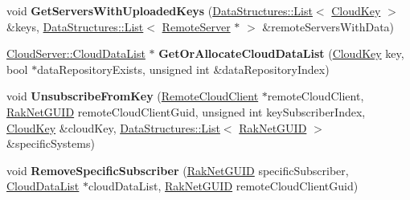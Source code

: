\begin{DoxyCompactItemize}
\item 
\hypertarget{class_rak_net_1_1_cloud_server_a79f583e54d15febc01656a9b9d668160}{void {\bfseries Get\-Servers\-With\-Uploaded\-Keys} (\hyperlink{class_data_structures_1_1_list}{Data\-Structures\-::\-List}$<$ \hyperlink{struct_rak_net_1_1_cloud_key}{Cloud\-Key} $>$ \&keys, \hyperlink{class_data_structures_1_1_list}{Data\-Structures\-::\-List}$<$ \hyperlink{struct_rak_net_1_1_cloud_server_1_1_remote_server}{Remote\-Server} $\ast$ $>$ \&remote\-Servers\-With\-Data)}\label{class_rak_net_1_1_cloud_server_a79f583e54d15febc01656a9b9d668160}

\item 
\hypertarget{class_rak_net_1_1_cloud_server_a4efe276b39cc626f002960ff9b1455ec}{\hyperlink{struct_rak_net_1_1_cloud_server_1_1_cloud_data_list}{Cloud\-Server\-::\-Cloud\-Data\-List} $\ast$ {\bfseries Get\-Or\-Allocate\-Cloud\-Data\-List} (\hyperlink{struct_rak_net_1_1_cloud_key}{Cloud\-Key} key, bool $\ast$data\-Repository\-Exists, unsigned int \&data\-Repository\-Index)}\label{class_rak_net_1_1_cloud_server_a4efe276b39cc626f002960ff9b1455ec}

\item 
\hypertarget{class_rak_net_1_1_cloud_server_af071cfd5ed3ed39d323469a0eb539247}{void {\bfseries Unsubscribe\-From\-Key} (\hyperlink{struct_rak_net_1_1_cloud_server_1_1_remote_cloud_client}{Remote\-Cloud\-Client} $\ast$remote\-Cloud\-Client, \hyperlink{struct_rak_net_1_1_rak_net_g_u_i_d}{Rak\-Net\-G\-U\-I\-D} remote\-Cloud\-Client\-Guid, unsigned int key\-Subscriber\-Index, \hyperlink{struct_rak_net_1_1_cloud_key}{Cloud\-Key} \&cloud\-Key, \hyperlink{class_data_structures_1_1_list}{Data\-Structures\-::\-List}$<$ \hyperlink{struct_rak_net_1_1_rak_net_g_u_i_d}{Rak\-Net\-G\-U\-I\-D} $>$ \&specific\-Systems)}\label{class_rak_net_1_1_cloud_server_af071cfd5ed3ed39d323469a0eb539247}

\item 
\hypertarget{class_rak_net_1_1_cloud_server_a153b4efcd916bab7eef13170f2b691d5}{void {\bfseries Remove\-Specific\-Subscriber} (\hyperlink{struct_rak_net_1_1_rak_net_g_u_i_d}{Rak\-Net\-G\-U\-I\-D} specific\-Subscriber, \hyperlink{struct_rak_net_1_1_cloud_server_1_1_cloud_data_list}{Cloud\-Data\-List} $\ast$cloud\-Data\-List, \hyperlink{struct_rak_net_1_1_rak_net_g_u_i_d}{Rak\-Net\-G\-U\-I\-D} remote\-Cloud\-Client\-Guid)}\label{class_rak_net_1_1_cloud_server_a153b4efcd916bab7eef13170f2b691d5}

\end{DoxyCompactItemize}
